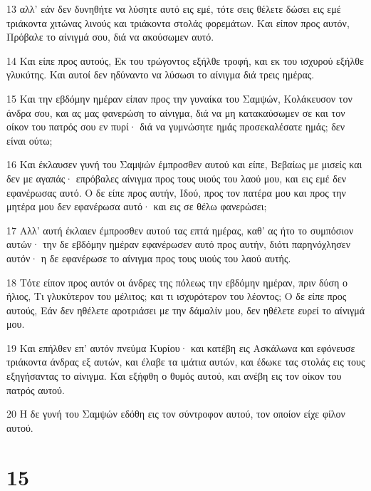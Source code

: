 \par 13 αλλ' εάν δεν δυνηθήτε να λύσητε αυτό εις εμέ, τότε σεις θέλετε δώσει εις εμέ τριάκοντα χιτώνας λινούς και τριάκοντα στολάς φορεμάτων. Και είπον προς αυτόν, Πρόβαλε το αίνιγμά σου, διά να ακούσωμεν αυτό.
\par 14 Και είπε προς αυτούς, Εκ του τρώγοντος εξήλθε τροφή, και εκ του ισχυρού εξήλθε γλυκύτης. Και αυτοί δεν ηδύναντο να λύσωσι το αίνιγμα διά τρεις ημέρας.
\par 15 Και την εβδόμην ημέραν είπαν προς την γυναίκα του Σαμψών, Κολάκευσον τον άνδρα σου, και ας μας φανερώση το αίνιγμα, διά να μη κατακαύσωμεν σε και τον οίκον του πατρός σου εν πυρί· διά να γυμνώσητε ημάς προσεκαλέσατε ημάς; δεν είναι ούτω;
\par 16 Και έκλαυσεν γυνή του Σαμψών έμπροσθεν αυτού και είπε, Βεβαίως με μισείς και δεν με αγαπάς· επρόβαλες αίνιγμα προς τους υιούς του λαού μου, και εις εμέ δεν εφανέρωσας αυτό. Ο δε είπε προς αυτήν, Ιδού, προς τον πατέρα μου και προς την μητέρα μου δεν εφανέρωσα αυτό· και εις σε θέλω φανερώσει;
\par 17 Αλλ' αυτή έκλαιεν έμπροσθεν αυτού τας επτά ημέρας, καθ' ας ήτο το συμπόσιον αυτών· την δε εβδόμην ημέραν εφανέρωσεν αυτό προς αυτήν, διότι παρηνόχλησεν αυτόν· η δε εφανέρωσε το αίνιγμα προς τους υιούς του λαού αυτής.
\par 18 Τότε είπον προς αυτόν οι άνδρες της πόλεως την εβδόμην ημέραν, πριν δύση ο ήλιος, Τι γλυκύτερον του μέλιτος; και τι ισχυρότερον του λέοντος; Ο δε είπε προς αυτούς, Εάν δεν ηθέλετε αροτριάσει με την δάμαλίν μου, δεν ηθέλετε ευρεί το αίνιγμά μου.
\par 19 Και επήλθεν επ' αυτόν πνεύμα Κυρίου· και κατέβη εις Ασκάλωνα και εφόνευσε τριάκοντα άνδρας εξ αυτών, και έλαβε τα ιμάτια αυτών, και έδωκε τας στολάς εις τους εξηγήσαντας το αίνιγμα. Και εξήφθη ο θυμός αυτού, και ανέβη εις τον οίκον του πατρός αυτού.
\par 20 Η δε γυνή του Σαμψών εδόθη εις τον σύντροφον αυτού, τον οποίον είχε φίλον αυτού.

\chapter{15}


